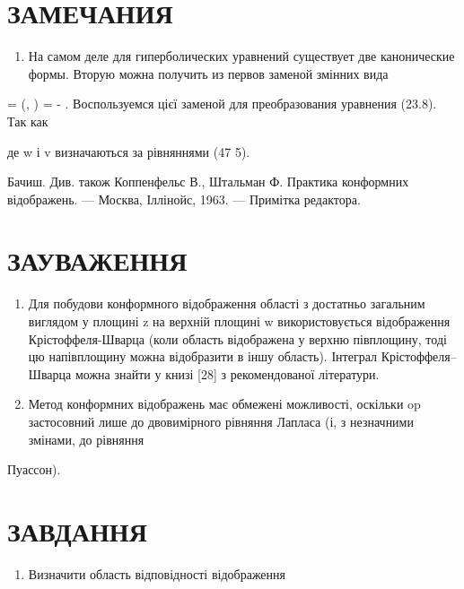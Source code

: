 \documentclass[
  ukrainian,
]{article}
\providecommand{\tightlist}{%
  \setlength{\itemsep}{0pt}\setlength{\parskip}{0pt}}
\begin{document}
\section{ЗАМЕЧАНИЯ}\label{ux437ux430ux43cux435ux447ux430ux43dux438ux44f-7}

\begin{enumerate}
\def\labelenumi{\arabic{enumi}.}
\tightlist
\item
  На самом деле для гиперболических уравнений существует две
  канонические формы. Вторую можна получить из первов заменой змінних
  вида
\end{enumerate}

\beta = \beta (\xi, \eta) = \xi - \eta. Воспользуемся цієї заменой для
преобразования уравнения (23.8). Так как

де w і v визначаються за рівняннями (47 5).

Бачиш. Див. також Коппенфельс В., Штальман Ф. Практика конформних
відображень. --- Москва, Іллінойс, 1963. --- Примітка редактора.

\section{ЗАУВАЖЕННЯ}\label{ux437ux430ux443ux432ux430ux436ux435ux43dux43dux44f-8}

\begin{enumerate}
\def\labelenumi{\arabic{enumi}.}
\item
  Для побудови конформного відображення області з достатньо загальним
  виглядом у площині z на верхній площині w використовується
  відображення Крістоффеля-Шварца (коли область відображена у верхню
  півплощину, тоді цю напівплощину можна відобразити в іншу область).
  Інтеграл Крістоффеля--Шварца можна знайти у книзі {[}28{]} з
  рекомендованої літератури.
\item
  Метод конформних відображень має обмежені можливості, оскільки op
  застосовний лише до двовимірного рівняння Лапласа (і, з незначними
  змінами, до рівняння
\end{enumerate}

Пуассон).

\section{ЗАВДАННЯ}\label{ux437ux430ux432ux434ux430ux43dux43dux44f-11}

\begin{enumerate}
\def\labelenumi{\arabic{enumi}.}
\tightlist
\item
  Визначити область відповідності відображення
\end{enumerate}
\end{document}
